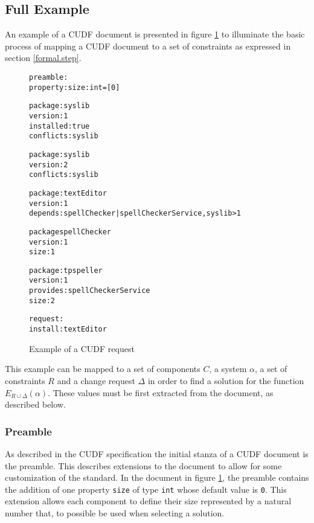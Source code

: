\subsection{Full Example}
\label{formal.example}
An example of a CUDF document is presented in figure \ref{formal.CUDFEXAMPLE} to illuminate the basic process of mapping a CUDF document to a set of constraints as expressed in section \ref{formal.step}.

\begin{figure}[htp] 
\begin{center}
\begin{alltt}
preamble:
property: size: int = [0]

package: syslib
version: 1
installed: true
conflicts: syslib

package: syslib
version: 2
conflicts: syslib

package: textEditor
version: 1
depends: spellChecker | spellCheckerService, syslib > 1

package spellChecker
version: 1
size: 1

package: tpspeller
version: 1
provides: spellCheckerService
size: 2

request:
install:textEditor

\end{alltt}
  \caption[CUDF Example]{Example of a CUDF request}
  \label{formal.CUDFEXAMPLE}
\end{center}
\end{figure} 

This example can be mapped to a set of components $C$, a system $\alpha$, a set of constraints $R$ and a change request $\Delta$ in order to find a solution for the function $E_{R \cup \Delta}(\alpha)$.
These values must be first extracted from the document, as described below.

\subsubsection{Preamble}
As described in the CUDF specification the initial stanza of a CUDF document is the preamble.
This describes extensions to the document to allow for some customization of the standard. 
In the document in figure \ref{formal.CUDFEXAMPLE}, the preamble contains the addition of one property \verb+size+ of type \verb+int+ whose default value is \verb+0+.
This extension allows each component to define their size represented by a natural number that, to possible be used when selecting a solution.

